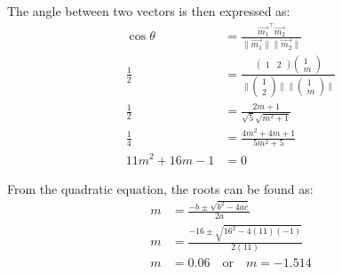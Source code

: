 \documentclass[12pt]{article}
\begin{document}
The angle between two vectors is then expressed as:
\begin{align*}
\cos \theta &= \frac{\vec{m_1}^\top \vec{m_2}}{\|\vec{m_1}\|\|\vec{m_2}\|} \\
\frac{1}{2} &= \frac{\begin{pmatrix} 1 & 2 \end{pmatrix} \begin{pmatrix} 1 \\ m \end{pmatrix}}{\|\begin{pmatrix} 1 \\ 2 \end{pmatrix}\|\|\begin{pmatrix} 1 \\ m \end{pmatrix}\|} \\
\frac{1}{2} &= \frac{2m + 1}{\sqrt{5} \sqrt{m^2 + 1}} \\
\frac{1}{4} &= \frac{4m^2 + 4m + 1}{5m^2 + 5} \\
11m^2 + 16m - 1 &= 0
\end{align*}

From the quadratic equation, the roots can be found as:
\begin{align*}
m &= \frac{-b \pm \sqrt{b^2 - 4ac}}{2a} \\
m &= \frac{-16 \pm \sqrt{16^2 - 4(11)(-1)}}{2(11)} \\
m &= 0.06 \quad \text{or} \quad m = -1.514
\end{align*}
\end{document}
